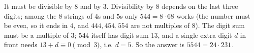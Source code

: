 It must be divisible by $8$ and by $3$. Divisibility by $8$ depends on the last three digits; among the $8$ strings of $4$s and $5$s only $544=8\cdot68$ works (the number must be even, so it ends in $4$, and $444,454,554$ are not multiples of $8$). The digit sum must be a multiple of $3$; $544$ itself has digit sum $13$, and a single extra digit $d$ in front needs $13+d\equiv0\pmod3$, i.e. $d=5$. So the answer is $\boxed{5544}=24\cdot231$.
